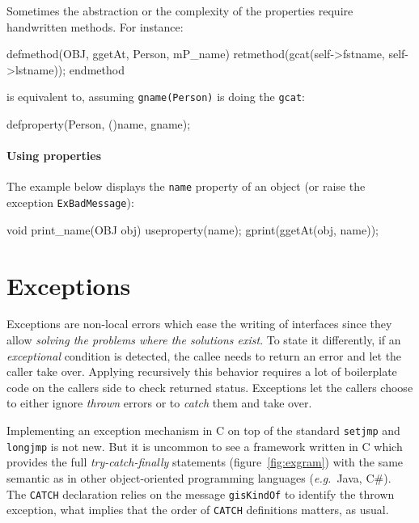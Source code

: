 \documentclass[preprint,10pt]{sigplanconf}
\newcommand{\abbrev}[1]{{\em #1}\xspace}
\newcommand{\eg}{\abbrev{e.g.}}
\newcommand{\ProgLang}[1]{{\sc #1}\xspace}
\newcommand{\Csharp}    {\ProgLang{C{\small\#}}}
\newcommand{\Java}      {\ProgLang{Java}}
\newcommand{\code}[1]{\lstinline[language=COS,style=samplecode]|#1|}
\begin{document}
Sometimes the abstraction or the complexity of the properties require handwritten methods. For instance:
\begin{COS}
defmethod(OBJ, ggetAt, Person, mP_name)
  retmethod(gcat(self->fstname, self->lstname));
endmethod
\end{COS}
is equivalent to, assuming \code{gname(Person)} is doing the \code{gcat}:
\begin{COS}
defproperty(Person, ()name, gname);
\end{COS}

\paragraph{Using properties}

The example below displays the \code{name} property of an object (or raise the exception \code{ExBadMessage}): 
\begin{COS}
void print_name(OBJ obj) {
  useproperty(name);
  gprint(ggetAt(obj, name));
}
\end{COS}

\section{Exceptions\label{sec:ex}}


Exceptions are non-local errors which ease the writing of interfaces since they allow {\em solving the problems where the solutions exist}. To state it differently, if an {\em exceptional} condition is detected, the callee needs to return an error and let the caller take over. Applying recursively this behavior requires a lot of boilerplate code on the callers side to check returned status. Exceptions let the callers choose to either ignore {\em thrown} errors or to {\em catch} them and take over.

Implementing an exception mechanism in C on top of the standard \code{setjmp} and \code{longjmp} is not new. But it is uncommon to see a framework written in C which provides the full {\em try-catch-finally} statements (figure~\ref{fig:exgram}) with the same semantic as in other object-oriented programming languages (\eg\ \Java, \Csharp). The \code{CATCH} declaration relies on the message \code{gisKindOf} to identify the thrown exception, what implies that the order of \code{CATCH} definitions matters, as usual.
\end{document}
